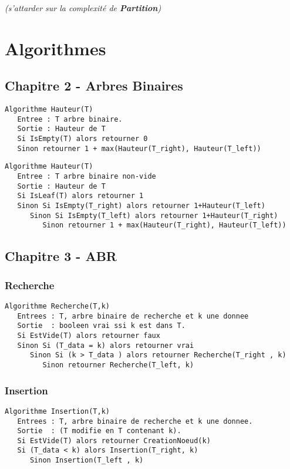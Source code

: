 \documentclass{article}
\begin{document}
\noindent\textit{(s'attarder sur la complexité de \textbf{Partition})}

\section{Algorithmes}

\subsection{Chapitre 2 - Arbres Binaires}

\begin{lstlisting}
Algorithme Hauteur(T)
   Entree : T arbre binaire.
   Sortie : Hauteur de T
   Si IsEmpty(T) alors retourner 0
   Sinon retourner 1 + max(Hauteur(T_right), Hauteur(T_left))
\end{lstlisting}

\begin{lstlisting}
Algorithme Hauteur(T)
   Entree : T arbre binaire non-vide
   Sortie : Hauteur de T
   Si IsLeaf(T) alors retourner 1
   Sinon Si IsEmpty(T_right) alors retourner 1+Hauteur(T_left)
      Sinon Si IsEmpty(T_left) alors retourner 1+Hauteur(T_right)
         Sinon retourner 1 + max(Hauteur(T_right), Hauteur(T_left))
\end{lstlisting}
\newpage
\subsection{Chapitre 3 - ABR}

\subsubsection{Recherche}

\begin{lstlisting}
Algorithme Recherche(T,k)
   Entrees : T, arbre binaire de recherche et k une donnee
   Sortie  : booleen vrai ssi k est dans T.
   Si EstVide(T) alors retourner faux
   Sinon Si (T_data = k) alors retourner vrai
      Sinon Si (k > T_data ) alors retourner Recherche(T_right , k)
         Sinon retourner Recherche(T_left, k)
\end{lstlisting}

\subsubsection{Insertion}

\begin{lstlisting}
Algorithme Insertion(T,k)
   Entrees : T, arbre binaire de recherche et k une donnee.
   Sortie  : (T modifie en T contenant k).
   Si EstVide(T) alors retourner CreationNoeud(k)
   Si (T_data < k) alors Insertion(T_right, k)
      Sinon Insertion(T_left , k)
\end{lstlisting}
\end{document}
